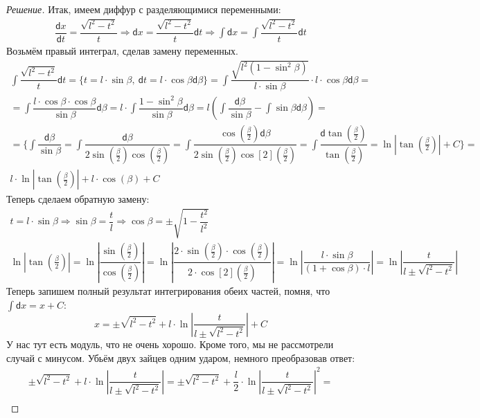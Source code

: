 \documentclass[a4paper,12pt]{article}
\renewcommand{\d}{\mathsf{d}}
\newcommand{\ds}{\displaystyle}
\begin{document}
\begin{proof}[Решение]
	Итак, имеем диффур с разделяющимися переменными:
	\begin{gather*}
		\dfrac{\d x}{\d t} = \dfrac{\sqrt{l^2 - t^2}}{t} \Longrightarrow \d x = \dfrac{\sqrt{l^2 - t^2}}{t}\d t \Longrightarrow \ds\int \d x = \ds \int \dfrac{\sqrt{l^2 - t^2}}{t} \d t
	\end{gather*}
	Возьмём правый интеграл, сделав замену переменных.
	\begin{gather*}
		\ds \int \dfrac{\sqrt{l^2 - t^2}}{t} \d t = \Big\{t = l \cdot \sin \beta,\ \d t = l\cdot \cos \beta \d \beta\Big\} = \ds\int \dfrac{\sqrt{l^2(1 - \sin^2 \beta)}}{l \cdot \sin \beta} \cdot l\cdot \cos \beta \d \beta =\\
		= \ds\int\dfrac{l \cdot \cos \beta \cdot \cos \beta}{\sin \beta}\d \beta = l \cdot \ds\int \dfrac{1 - \sin^2 \beta}{\sin \beta}\d \beta = l \left(\ds\int \dfrac{\d \beta}{\sin\beta} - \ds\int \sin\beta \d \beta\right) = \\
		=\Big\{\ds\int\dfrac{\d \beta}{\sin\beta} = \ds\int\dfrac{\d \beta}{2\sin(\frac{\beta}{2})\cos(\frac{\beta}{2})} = \ds\int\dfrac{\cos(\frac{\beta}{2})\d\beta}{2\sin(\frac{\beta}{2})\cos[2](\frac{\beta}{2})} = \ds\int\dfrac{\d \tan(\frac{\beta}{2})}{\tan(\frac{\beta}{2})} = \ln\left|\tan(\frac{\beta}{2})\right| + C\Big\} = \\
		l\cdot \ln\left|\tan(\frac{\beta}{2})\right| + l \cdot \cos(\beta) + C
	\end{gather*}
	Теперь сделаем обратную замену:
	\begin{gather*}
		t = l\cdot \sin\beta \Longrightarrow \sin\beta = \dfrac{t}{l} \Longrightarrow \cos\beta = \ds\pm\sqrt{1 - \dfrac{t^2}{l^2}}\\
		\ln\left|\tan(\frac{\beta}{2})\right| = \ln\left|\dfrac{\sin(\frac{\beta}{2})}{\cos(\frac{\beta}{2})}\right| = \ln\left|\dfrac{2\cdot \sin(\frac{\beta}{2})\cdot\cos(\frac{\beta}{2})}{2\cdot \cos[2](\frac{\beta}{2})}\right| = \ln\left|\dfrac{l\cdot \sin\beta}{\left(1 + \cos\beta\right)\cdot l}\right| = \ln\left|\dfrac{t}{l \pm \sqrt{l^2 - t^2}}\right|
	\end{gather*}
	Теперь запишем полный результат интегрирования обеих частей, помня, что $\ds\int \d x = x + C$:
	\[x = \ds\pm \sqrt{l^2 - t^2} + l\cdot \ln\left|\dfrac{t}{l \pm \sqrt{l^2 - t^2}}\right| + C\]
	У нас тут есть модуль, что не очень хорошо. Кроме того, мы не рассмотрели случай с минусом. Убьём двух зайцев одним ударом, немного преобразовав ответ:
	\begin{gather*}
		\ds\pm \sqrt{l^2 - t^2} + l\cdot \ln\left|\dfrac{t}{l \pm \sqrt{l^2 - t^2}}\right| = \ds\pm \sqrt{l^2 - t^2} + \dfrac{l}{2}\cdot \ln\left|\dfrac{t}{l \pm \sqrt{l^2 - t^2}}\right|^2 =\\

\end{gather*}
\end{proof}
\end{document}
